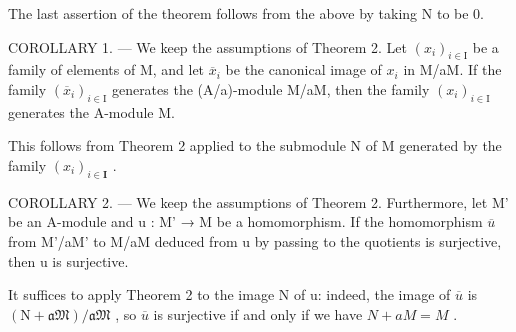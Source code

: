 The last assertion of the theorem follows from the above by taking N to be 0.

COROLLARY 1. --- We keep the assumptions of Theorem 2. Let \((x_{i})_{i\in\mathrm{I}}\) be a family of elements of M, and let \(\overline{x}_{i}\) be the canonical image of \(x_{i}\) in M/aM. If the family \((\overline{x}_{i})_{i\in\mathrm{I}}\) generates the (A/a)-module M/aM, then the family \((x_{i})_{i\in\mathrm{I}}\) generates the A-module M.

This follows from Theorem 2 applied to the submodule N of M generated by the family \((x_{i})_{i\in \mathbf{I}}\) .

COROLLARY 2. --- We keep the assumptions of Theorem 2. Furthermore, let M' be an A-module and u : M' → M be a homomorphism. If the homomorphism \(\overline{u}\) from M'/aM' to M/aM deduced from u by passing to the quotients is surjective, then u is surjective.

It suffices to apply Theorem 2 to the image N of u: indeed, the image of \(\overline{u}\) is \((\mathrm{N} + \mathfrak{aM})/\mathfrak{aM}\) , so \(\overline{u}\) is surjective if and only if we have \(N + aM = M\) .

